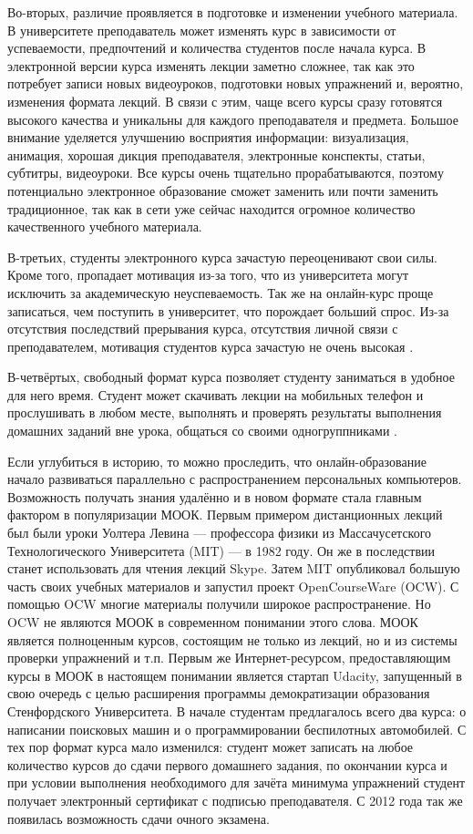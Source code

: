 \documentclass{matmex-diploma-custom}
\begin{document}
Во-вторых, различие проявляется в подготовке и изменении учебного
материала. В университете преподаватель может изменять курс в
зависимости от успеваемости, предпочтений и количества студентов после
начала курса. В электронной версии курса изменять лекции заметно
сложнее, так как это потребует записи новых видеоуроков, подготовки
новых упражнений и, вероятно, изменения формата лекций. В связи с
этим, чаще всего курсы сразу готовятся высокого качества и уникальны
для каждого преподавателя и предмета. Большое внимание уделяется
улучшению восприятия информации: визуализация, анимация, хорошая
дикция преподавателя, электронные конспекты, статьи, субтитры,
видеоуроки. Все курсы очень тщательно прорабатываются, поэтому
потенциально электронное образование сможет заменить или почти
заменить традиционное, так как в сети уже сейчас находится огромное
количество качественного учебного материала.

В-третьих, студенты электронного курса зачастую переоценивают свои
силы. Кроме того, пропадает мотивация из-за того, что из университета
могут исключить за академическую неуспеваемость. Так же на онлайн-курс
проще записаться, чем поступить в университет, что порождает больший
спрос. Из-за отсутствия последствий прерывания курса, отсутствия
личной связи с преподавателем, мотивация студентов курса зачастую не
очень высокая \cite{Clow}.

В-четвёртых, свободный формат курса позволяет студенту заниматься в
удобное для него время. Студент может скачивать лекции на мобильных
телефон и прослушивать в любом месте, выполнять и проверять результаты
выполнения домашних заданий вне урока, общаться со своими
одногруппниками \cite{mak2010blogs}.

Если углубиться в историю, то можно проследить, что онлайн-образование
начало развиваться параллельно с распространением персональных
компьютеров. Возможность получать знания удалённо и в новом формате
стала главным фактором в популяризации МООК. Первым примером
дистанционных лекций был были уроки Уолтера Левина --- профессора
физики из Массачусетского Технологического Университета (MIT) --- в
1982 году. Он же в последствии станет использовать для чтения лекций
Skype. Затем MIT опубликовал большую часть своих учебных материалов и
запустил проект OpenCourseWare (OCW). С помощью OCW многие материалы
получили широкое распространение. Но OCW не являются МООК в
современном понимании этого слова. МООК является полноценным курсов,
состоящим не только из лекций, но и из системы проверки упражнений и
т.п. Первым же Интернет-ресурсом, предоставляющим курсы в МООК в
настоящем понимании является стартап Udacity, запущенный в свою
очередь с целью расширения программы демократизации образования
Стенфордского Университета. В начале студентам предлагалось всего два
курса: о написании поисковых машин и о программировании беспилотных
автомобилей. С тех пор формат курса мало изменился: студент может
записать на любое количество курсов до сдачи первого домашнего
задания, по окончании курса и при условии выполнения необходимого для
зачёта минимума упражнений студент получает электронный сертификат с
подписью преподавателя. С 2012 года так же появилась возможность сдачи
очного экзамена.
\end{document}
